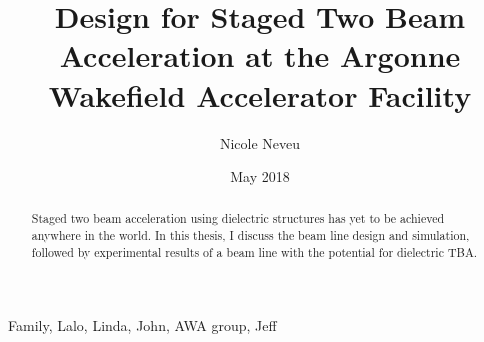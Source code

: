 \documentclass{iitthesis}
\begin{document}
\title{Design for Staged Two Beam Acceleration at the Argonne Wakefield Accelerator Facility}

\author{Nicole Neveu }
\date{May 2018}
\copyrightnoticetrue      %
\maketitle                %


\prelimpages         %

\begin{acknowledgement}     %
	\par  Family, Lalo, Linda, John, AWA group, Jeff
\end{acknowledgement}

\tableofcontents
\clearpage

\listoftables

\clearpage

\listoffigures

\clearpage


\listofsymbols
{}

\clearpage

\begin{abstract}           %
	\par Staged two beam acceleration using dielectric structures has yet to 
	be achieved anywhere in the world. In this thesis, I discuss the beam 
	line design and simulation, followed by experimental results of a 
	beam line with the potential for dielectric TBA.   
\end{abstract}

\textpages     %

\end{document}
